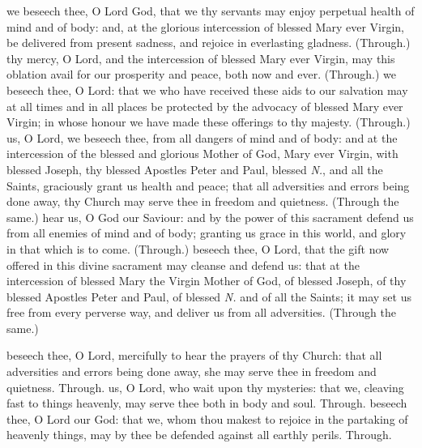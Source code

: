 \begin{multicols}{2}
    \label{SPMaryInEaster}
     we beseech thee, O Lord God, that we thy servants may enjoy perpetual health of mind and of body: and, at the glorious intercession of blessed Mary ever Virgin, be delivered from present sadness, and rejoice in everlasting gladness. (Through.)
     thy mercy, O Lord, and the intercession of blessed Mary ever Virgin, may this oblation avail for our prosperity and peace, both now and ever. (Through.)
     we beseech thee, O Lord: that we who have received these aids to our salvation may at all times and in all places be protected by the advocacy of blessed Mary ever Virgin; in whose honour we have made these offerings to thy majesty. (Through.)\\

    \label{SPSaints}
     us, O Lord, we beseech thee, from all dangers of mind and of body: and at the intercession of the blessed and glorious Mother of God, Mary ever Virgin, with blessed Joseph, thy blessed Apostles Peter and Paul, blessed \emph{N.}, and all the Saints, graciously grant us health and peace; that all adversities and errors being done away, thy Church may serve thee in freedom and quietness. (Through the same.)
     hear us, O God our Saviour: and by the power of this sacrament defend us from all enemies of mind and of body; granting us grace in this world, and glory in that which is to come. (Through.)
     beseech thee, O Lord, that the gift now offered in this divine sacrament may cleanse and defend us: that at the intercession of blessed Mary the Virgin Mother of God, of blessed Joseph, of thy blessed Apostles Peter and Paul, of blessed \emph{N.} and of all the Saints; it may set us free from every perverse way, and deliver us from all adversities. (Through the same.)
    
   \label{SPAgainst}
    beseech thee, O Lord, mercifully to hear the prayers of thy Church: that all adversities and errors being done away, she may serve thee in freedom and quietness. Through.
    us, O Lord, who wait upon thy mysteries: that we, cleaving fast to things heavenly, may serve thee both in body and soul. Through.
    beseech thee, O Lord our God: that we, whom thou makest to rejoice in the partaking of heavenly things, may by thee be defended against all earthly perils. Through.
   

\end{multicols}
